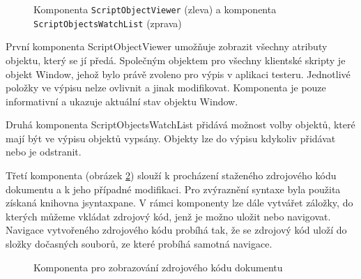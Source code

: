 \begin{figure}[H]
  \begin{center}
    \caption{Komponenta \texttt{ScriptObjectViewer} (zleva) a komponenta \texttt{ScriptObjectsWatchList} (zprava)}
    \label{Figure.ScriptObjectViewerAndWatchList}
  \end{center}
\end{figure}

První komponenta ScriptObjectViewer umožňuje zobrazit všechny atributy objektu, který se jí předá. Společným objektem pro všechny klientské skripty je objekt Window, jehož bylo právě zvoleno pro výpis v aplikaci testeru. Jednotlivé položky ve výpisu nelze ovlivnit a jinak modifikovat. Komponenta je pouze informativní a ukazuje aktuální stav objektu Window.

Druhá komponenta ScriptObjectsWatchList přidává možnost volby objektů, které mají být ve výpisu objektů vypsány. Objekty lze do výpisu kdykoliv přidávat nebo je odstranit.  

Třetí komponenta (obrázek \ref{Figure.SourceCodeComponent}) slouží k procházení staženého zdrojového kódu dokumentu a k jeho případné modifikaci. Pro zvýraznění syntaxe byla použita získaná knihovna jsyntaxpane. V rámci komponenty lze dále vytvářet záložky, do kterých můžeme vkládat zdrojový kód, jenž je možno uložit nebo navigovat. Navigace vytvořeného zdrojového kódu probíhá tak, že se zdrojový kód uloží do složky dočasných souborů, ze které probíhá samotná navigace. 

\begin{figure}[H]
  \begin{center}
    \caption{Komponenta pro zobrazování zdrojového kódu dokumentu}
    \label{Figure.SourceCodeComponent}
  \end{center}
\end{figure}

